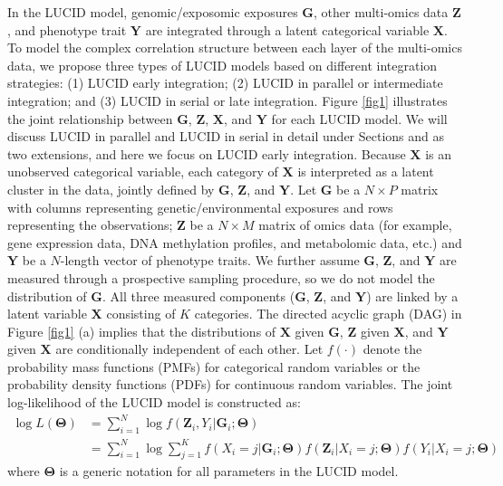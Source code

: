 In the LUCID model, genomic/exposomic exposures $\bm G$, other multi-omics data $\bm Z$, and phenotype trait $\bm Y$ are integrated through a latent categorical variable $\bm X$. To model the complex correlation structure between each layer of the multi-omics data, we propose three types of LUCID models based on different integration strategies: (1) LUCID early integration; (2) LUCID in parallel or intermediate integration; and (3) LUCID in serial or late integration. Figure \ref{fig1} illustrates the joint relationship between $\bm G$, $\bm Z$, $\bm X$, and $\bm Y$ for each LUCID model. We will discuss LUCID in parallel and LUCID in serial in detail under Sections  and  as two extensions, and here we focus on LUCID early integration. Because $\bm X$ is an unobserved categorical variable, each category of $\bm X$ is interpreted as a latent cluster in the data, jointly defined by $\bm G$, $\bm Z$, and $\bm Y$. Let $\bm G$ be a $N \times P$ matrix with columns representing genetic/environmental exposures and rows representing the observations; $\bm Z$ be a $N \times M$ matrix of omics data (for example, gene expression data, DNA methylation profiles, and metabolomic data, etc.) and $\bm Y$ be a $N$-length vector of phenotype traits. We further assume $\bm G$, $\bm Z$, and $\bm Y$ are measured through a prospective sampling procedure, so we do not model the distribution of $\bm G$. All three measured components ($\bm G$, $\bm Z$, and $\bm Y$) are linked by a latent variable $\bm X$ consisting of $K$ categories. The directed acyclic graph (DAG) in Figure \ref{fig1} (a) implies that the distributions of $\bm X$ given $\bm G$, $\bm Z$ given $\bm X$, and $\bm Y$ given $\bm X$ are conditionally independent of each other. Let $f(\cdot)$ denote the probability mass functions (PMFs) for categorical random variables or the probability density functions (PDFs) for continuous random variables. The joint log-likelihood of the LUCID model is constructed as:
\begin{equation}
    \begin{aligned}
         \log L(\bm{\Theta}) & = \sum_{i = 1}^N \log f(\bm{Z}_i, Y_i|\bm{G}_i;\bm{\Theta}) \\
         & = \sum_{i = 1}^N \log \sum_{j = 1}^K f(X_i = j| \bm{G}_i; \bm{\Theta}) f(\bm{Z}_i| X_i = j; \bm{\Theta}) f(Y_i|X_i = j; \bm{\Theta})
    \end{aligned}
    \label{eq1}
\end{equation}
where $\bm \Theta$ is a generic notation for all parameters in the LUCID model.
